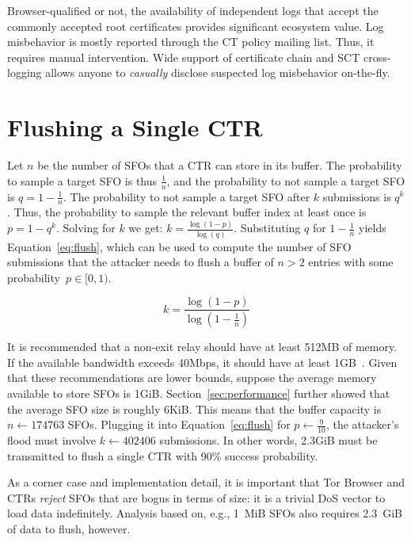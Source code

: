 Browser-qualified or not, the availability of independent logs that accept the
commonly accepted root certificates provides significant ecosystem value.
Log misbehavior is mostly reported through the CT policy mailing list.  Thus, it
requires manual intervention.  Wide support of certificate chain and SCT
cross-logging allows anyone to \emph{casually} disclose suspected log
misbehavior on-the-fly.

\section{Flushing a Single CTR} \label{app:flush}
Let $n$ be the number of SFOs that a CTR can store in its buffer.  The
probability to sample a target SFO is thus $\frac{1}{n}$, and the probability to
not sample a target SFO is $q = 1 - \frac{1}{n}$.  The probability to not sample
a target SFO after $k$ submissions is $q^k$.  Thus, the probability to sample
the relevant buffer index at least once is $p = 1 - q^k$.  Solving for $k$ we
get: $k = \frac{\log(1 - p)}{\log(q)}$.  Substituting $q$ for $1 - \frac{1}{n}$
yields Equation~\ref{eq:flush}, which can be used to compute the number of
SFO submissions that the attacker needs to flush a buffer of $n>2$
entries with some probability~$p\in[0,1)$.

\begin{equation} \label{eq:flush}
	k = \frac{\log(1-p)}{\log(1 - \frac{1}{n})}
\end{equation}

It is recommended that a non-exit relay should have at least 512MB of memory.
If the available bandwidth exceeds 40Mbps, it should have at least
1GB~\cite{relay-config}.  Given that these recommendations are lower bounds,
suppose the average memory available to store SFOs is 1GiB.
Section~\ref{sec:performance} further showed that the average SFO size is
roughly 6KiB.  This means that the buffer capacity is $n \gets 174763$ SFOs.
Plugging it into Equation~\ref{eq:flush} for $p \gets \frac{9}{10}$, the
attacker's flood must involve $k \gets 402406$ submissions.  In other words,
2.3GiB must be transmitted to flush a single CTR with 90\% success probability.

As a corner case and implementation detail, it is important that Tor Browser and
CTRs \emph{reject} SFOs that are bogus in terms of size: it is a trivial DoS
vector to load data indefinitely. Analysis based on, e.g., 1~MiB SFOs also
requires 2.3~GiB of data to flush, however.
